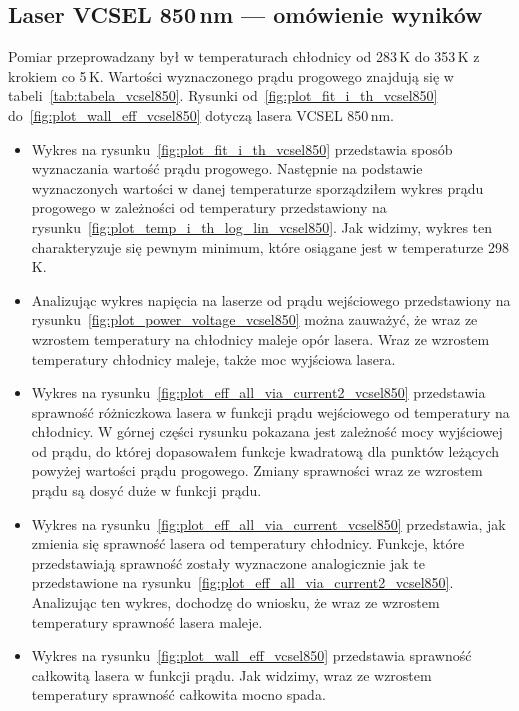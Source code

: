 \newpage
\subsection{Laser VCSEL 850\,nm --- omówienie wyników}
Pomiar przeprowadzany był w temperaturach chłodnicy od 283\,K do 353\,K z krokiem co 5\,K. Wartości wyznaczonego prądu progowego
znajdują się w tabeli~\ref{tab:tabela_vcsel850}. Rysunki od~\ref{fig:plot_fit_i_th_vcsel850} do~\ref{fig:plot_wall_eff_vcsel850} dotyczą lasera
VCSEL 850\,nm.
\begin{itemize}
\item Wykres na rysunku~\ref{fig:plot_fit_i_th_vcsel850} przedstawia sposób wyznaczania wartość prądu progowego. Następnie na podstawie
wyznaczonych wartości w danej temperaturze sporządziłem wykres prądu progowego w zależności od temperatury
przedstawiony na rysunku~\ref{fig:plot_temp_i_th_log_lin_vcsel850}. Jak widzimy, wykres ten charakteryzuje się pewnym minimum, które
osiągane jest w temperaturze 298\,K.
\item Analizując wykres napięcia na laserze od prądu wejściowego przedstawiony na rysunku~\ref{fig:plot_power_voltage_vcsel850}
można zauważyć, że wraz ze wzrostem temperatury na chłodnicy
maleje opór lasera. Wraz ze wzrostem temperatury chłodnicy maleje, także moc wyjściowa lasera.
\item Wykres na rysunku~\ref{fig:plot_eff_all_via_current2_vcsel850} przedstawia sprawność różniczkowa lasera w funkcji prądu wejściowego
od temperatury na chłodnicy. W górnej części rysunku pokazana jest zależność mocy wyjściowej od prądu, do której dopasowałem
funkcje kwadratową dla punktów leżących powyżej wartości prądu progowego.
Zmiany sprawności wraz ze wzrostem prądu są dosyć duże w funkcji prądu.
\item Wykres na rysunku~\ref{fig:plot_eff_all_via_current_vcsel850} przedstawia, jak zmienia się sprawność lasera od temperatury chłodnicy.
Funkcje, które przedstawiają sprawność zostały wyznaczone analogicznie jak te przedstawione na rysunku~\ref{fig:plot_eff_all_via_current2_vcsel850}.
Analizując ten wykres, dochodzę do wniosku, że wraz ze wzrostem temperatury sprawność lasera maleje.
\item Wykres na rysunku~\ref{fig:plot_wall_eff_vcsel850} przedstawia sprawność całkowitą lasera w funkcji prądu. Jak widzimy,
wraz ze wzrostem temperatury sprawność całkowita mocno spada.
\end{itemize}
